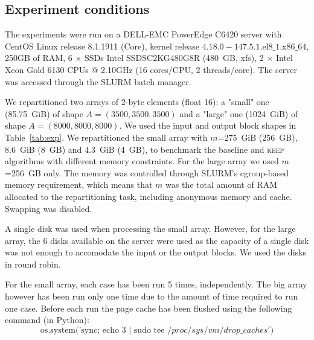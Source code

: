 \documentclass[sigconf, nonacm]{acmart}
\newcommand{\keep}[0]{\textsc{keep}\xspace}
\begin{document}
\subsection{Experiment conditions}
The experiments were run on a DELL-EMC PowerEdge C6420 server
with CentOS Linux release 8.1.1911 (Core), kernel release
$4.18.0-147.5.1.\textrm{el}8\_1.\textrm{x}86\_64$, 250GB of RAM,
6 $\times$ SSDs Intel SSDSC2KG480G8R (480~GB, xfs),
2 $\times$ Intel Xeon Gold 6130 CPUs @ 2.10GHz (16 cores/CPU, 2 threads/core).
The server was accessed through the SLURM batch manager.

We repartitioned two arrays of 2-byte elements (float 16): a "small" one (85.75~GiB)  of shape $A=(3500,3500,3500)$
and a "large" one (1024~GiB) of shape $A=(8000,8000,8000)$.
We used the input and output block shapes in Table~\ref{tab:exp}.
We repartitioned the small array with $m$=275~GiB (256~GB), 8.6~GiB (8~GB)
 and 4.3~GiB (4~GB), to benchmark the baseline and \keep algorithms with different
 memory constraints. For the large array we used $m$=256~GB only.
The memory was controlled through SLURM's cgroup-based memory requirement,
which means that $m$ was the total amount of RAM allocated to the
repartitioning task, including anonymous memory and cache. Swapping was
disabled.

A single disk was used when processing the small array. However, for the
large array, the 6 disks available on the server were used as the capacity of a single disk was not
enough to accomodate the input or the output blocks. We used the disks in
round robin.

For the small array, each case has been run 5 times, independently.
The big array however has been run only one time due to the amount of time
required to run one case.
Before each run the page cache has been flushed using the following command (in Python):
$$\textrm{os.system('sync; echo 3 | sudo tee }/proc/sys/vm/drop\_caches')$$
\end{document}
